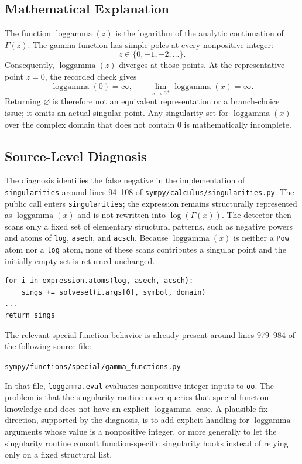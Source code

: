 \documentclass[11pt]{article}
\begin{document}
\subsection{Mathematical Explanation}

The function \(\operatorname{loggamma}(z)\) is the logarithm of the analytic
continuation of \(\Gamma(z)\). The gamma function has simple poles at every
nonpositive integer:
\[
    z \in \{0, -1, -2, \ldots\}.
\]
Consequently, \(\operatorname{loggamma}(z)\) diverges at those points. At the
representative point \(z=0\), the recorded check gives
\[
    \operatorname{loggamma}(0) = \infty,
    \qquad
    \lim_{x \to 0^+} \operatorname{loggamma}(x) = \infty.
\]
Returning \(\varnothing\) is therefore not an equivalent representation or a
branch-choice issue; it omits an actual singular point. Any singularity set for
\(\operatorname{loggamma}(x)\) over the complex domain that does not contain
\(0\) is mathematically incomplete.

\subsection{Source-Level Diagnosis}

The diagnosis identifies the false negative in the implementation of
\texttt{singularities} around lines 94--108 of
\nolinkurl{sympy/calculus/singularities.py}. The public call enters
\texttt{singularities}; the expression remains structurally represented as
\(\operatorname{loggamma}(x)\) and is not rewritten into \(\log(\Gamma(x))\).
The detector then scans only a fixed set of elementary structural patterns, such
as negative powers and atoms of \texttt{log}, \texttt{asech}, and
\texttt{acsch}. Because \(\operatorname{loggamma}(x)\) is neither a
\texttt{Pow} atom nor a \texttt{log} atom, none of these scans contributes a
singular point and the initially empty set is returned unchanged.

\begin{lstlisting}[style=bugpython]
for i in expression.atoms(log, asech, acsch):
    sings += solveset(i.args[0], symbol, domain)
...
return sings
\end{lstlisting}

The relevant special-function behavior is already present around lines 979--984
of the following source file:
\begin{center}
  \nolinkurl{sympy/functions/special/gamma_functions.py}
\end{center}
In that file, \texttt{loggamma.eval} evaluates nonpositive integer inputs to
\texttt{oo}. The problem is that the singularity routine never queries that
special-function knowledge and does not have an explicit
\(\operatorname{loggamma}\) case. A plausible fix direction, supported by the
diagnosis, is to add explicit handling for \(\operatorname{loggamma}\) arguments
whose value is a nonpositive integer, or more generally to let the singularity
routine consult function-specific singularity hooks instead of relying only on a
fixed structural list.
\end{document}
